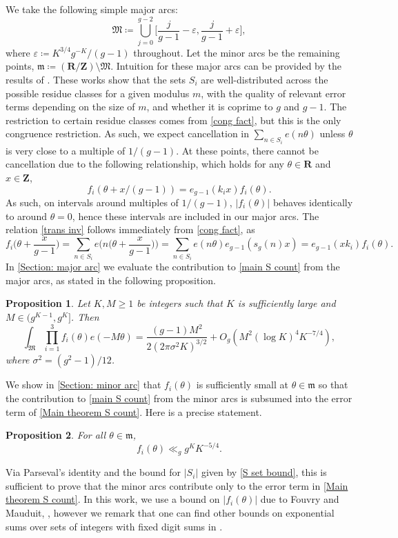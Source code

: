 \documentclass[hidelinks,11pt,reqno]{amsart}
\renewcommand{\geq}{\geqslant}
\newcommand{\Z}{\ensuremath{\mathbf{Z}}}
\newcommand{\R}{\ensuremath{\mathbf{R}}}
\newcommand{\ru}[1]{e_{g-1}(#1)}
\newtheorem{prop}{Proposition}[section]
\theoremstyle{remark}
\begin{document}
We take the following simple major arcs:
\begin{equation*}
    \mathfrak{M}\coloneq \bigcup_{j=0}^{g-2}\Big [\frac{j}{g-1}-\varepsilon, \frac{j}{g-1}+\varepsilon\Big ],
\end{equation*}
where $\varepsilon\coloneq K^{3/4}g^{-K}/(g-1)$ throughout. Let the minor arcs be the remaining points, $\mathfrak{m}\coloneq (\R/\Z)\setminus \mathfrak{M}$. Intuition for these major arcs can be provided by the results of \cite{de2003counting,mauduit2005distribution,mauduit1997arithmetic}. These works show that the sets $S_{i}$ are well-distributed across the possible residue classes for a given modulus $m$, with the quality of relevant error terms depending on the size of $m$, and whether it is coprime to $g$ and $g-1$. The restriction to certain residue classes comes from \cref{cong fact}, but this is the only congruence restriction. As such, we expect cancellation in $\sum_{n\in S_{i}}e(n\theta)$ unless $\theta$ is very close to a multiple of $1/(g-1)$. At these points, there cannot be cancellation due to the following relationship, which holds for any $\theta \in \R$ and $x\in\Z$, 
\begin{equation}\label{trans inv}
    f_{i}(\theta+x/(g-1))=\ru{k_{i}x}f_{i}(\theta).
\end{equation}
As such, on intervals around multiples of $1/(g-1)$, $|f_{i}(\theta)|$ behaves identically to around $\theta=0$, hence these intervals are included in our major arcs. The relation \cref{trans inv} follows immediately from \cref{cong fact}, as
\[f_{i}\Big(\theta+\frac{x}{g-1}\Big)=\sum_{n\in S_{i}}e\Big (n\Big(\theta+\frac{x}{g-1}\Big) \Big )=\sum_{n\in S_{i}}e(n\theta)\ru{s_{g}(n)x}=\ru{xk_{i}}f_{i}(\theta).\]
 In \cref{Section: major arc} we evaluate the contribution to \cref{main S count} from the major arcs, as stated in the following proposition.
\begin{prop}\label{major arc contrib}
Let $K,M\geq 1$ be integers such that $K$ is sufficiently large and $M\in (g^{K-1},g^{K}]$. Then
    \[\int_{\mathfrak{M}}\prod_{i=1}^{3}f_{i}(\theta)e(-M\theta)=\frac{(g-1)M^{2}}{2(2\pi\sigma^{2}K)^{3/2}}+O_{g}(M^{2}(\log K)^{4}K^{-7/4}),\]
where $\sigma^{2}=(g^{2}-1)/12$.
\end{prop}
We show in \cref{Section: minor arc} that $f_{i}(\theta)$ is sufficiently small at $\theta\in \mathfrak{m}$ so that the contribution to \cref{main S count} from the minor arcs is subsumed into the error term of \cref{Main theorem S count}. Here is a precise statement.
\begin{prop}\label{minor arc bound} For all $\theta \in \mathfrak{m}$,
   \[f_{i}(\theta) \ll_{g} g^{K}K^{-5/4}.\] 
\end{prop}
Via Parseval's identity and the bound for $|S_{i}|$ given by \cref{S set bound}, this is sufficient to prove that the minor arcs contribute only to the error term in \cref{Main theorem S count}. In this work, we use a bound on $|f_{i}(\theta)|$ due to Fouvry and Mauduit, \cite{fouvry2005entiers}, however we remark that one can find other bounds on exponential sums over sets of integers with fixed digit sums in \cite{de2003counting, mauduit2017digits, shparlinski2024weyl}.
\end{document}
